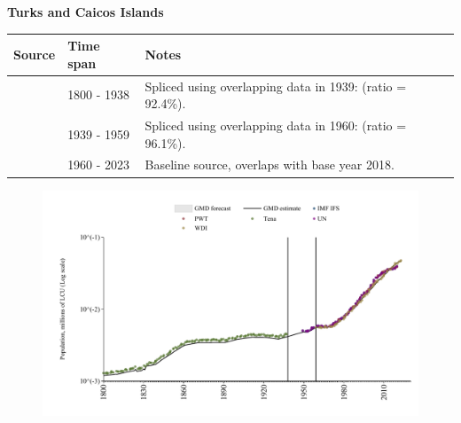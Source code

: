 \documentclass[12pt,a4paper,landscape]{article}
\begin{document}
\begin{adjustbox}{max totalsize={\paperwidth}{\paperheight},center}
\begin{minipage}[t][\textheight][t]{\textwidth}
\vspace*{0.5cm}
{}
\begin{center}
{\Large\bfseries Turks and Caicos Islands}
\end{center}
\vspace{0.5cm}
\begin{table}[H]
\centering
\small
\begin{tabular}{|l|l|l|}
\hline
\textbf{Source} & \textbf{Time span} & \textbf{Notes} \\
\hline
\rowcolor{white}\cite{Tena}& 1800 - 1938 &Spliced using overlapping data in 1939: (ratio = 92.4\%).\\
\rowcolor{lightgray}\cite{IMF_IFS}& 1939 - 1959 &Spliced using overlapping data in 1960: (ratio = 96.1\%).\\
\rowcolor{white}\cite{WDI}& 1960 - 2023 &Baseline source, overlaps with base year 2018.\\
\hline
\end{tabular}
\end{table}
\begin{figure}[H]
\centering
\includegraphics[width=\textwidth,height=0.6\textheight,keepaspectratio]{graphs/TCA_pop.pdf}
\end{figure}
\end{minipage}
\end{adjustbox}
\end{document}
